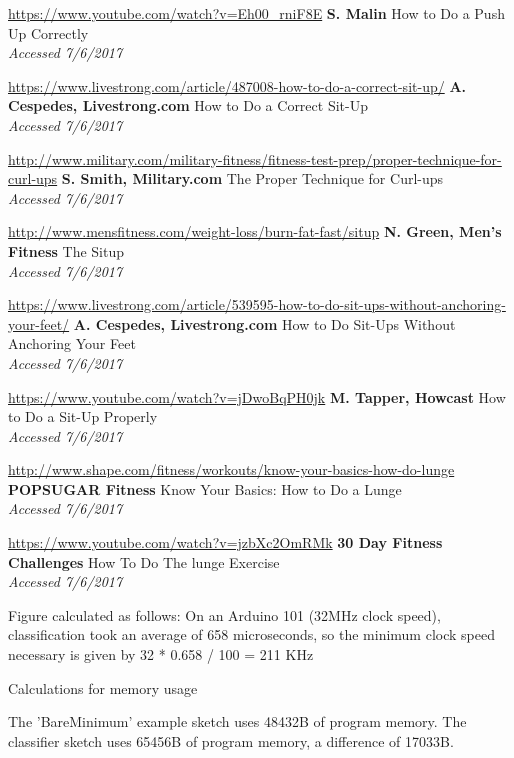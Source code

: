 \documentclass[a4paper]{article}
\begin{document}
\begin{thebibliography}{9}
\url{https://www.youtube.com/watch?v=Eh00_rniF8E}
\textbf{S. Malin}
How to Do a Push Up Correctly
\\\textit{Accessed 7/6/2017}

\url{https://www.livestrong.com/article/487008-how-to-do-a-correct-sit-up/}
\textbf{A. Cespedes, Livestrong.com}
How to Do a Correct Sit-Up
\\\textit{Accessed 7/6/2017}

\url{http://www.military.com/military-fitness/fitness-test-prep/proper-technique-for-curl-ups}
\textbf{S. Smith, Military.com}
The Proper Technique for Curl-ups
\\\textit{Accessed 7/6/2017}

\url{http://www.mensfitness.com/weight-loss/burn-fat-fast/situp}
\textbf{N. Green, Men's Fitness}
The Situp
\\\textit{Accessed 7/6/2017}

\url{https://www.livestrong.com/article/539595-how-to-do-sit-ups-without-anchoring-your-feet/}
\textbf{A. Cespedes, Livestrong.com}
How to Do Sit-Ups Without Anchoring Your Feet
\\\textit{Accessed 7/6/2017}

\url{https://www.youtube.com/watch?v=jDwoBqPH0jk}
\textbf{M. Tapper, Howcast}
How to Do a Sit-Up Properly
\\\textit{Accessed 7/6/2017}

\url{http://www.shape.com/fitness/workouts/know-your-basics-how-do-lunge}
\textbf{POPSUGAR Fitness}
Know Your Basics: How to Do a Lunge
\\\textit{Accessed 7/6/2017}

\url{https://www.youtube.com/watch?v=jzbXc2OmRMk}
\textbf{30 Day Fitness Challenges}
How To Do The lunge Exercise
\\\textit{Accessed 7/6/2017}


Figure calculated as follows: On an Arduino 101 (32MHz clock speed), classification took an average of 658 microseconds, so the minimum clock speed necessary is given by 32 * 0.658 / 100 = 211 KHz

Calculations for memory usage

The 'BareMinimum' example sketch uses 48432B of program memory. The classifier sketch uses 65456B of program memory, a difference of 17033B.


\end{thebibliography}
\end{document}
